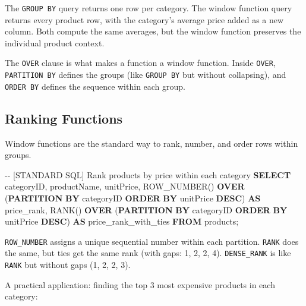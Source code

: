 \documentclass[
  letterpaper,
  DIV=11,
  numbers=noendperiod]{scrreprt}
\newenvironment{Shaded}{\begin{snugshade}}{\end{snugshade}}
\newcommand{\CommentTok}[1]{\textcolor[rgb]{0.37,0.37,0.37}{#1}}
\newcommand{\FunctionTok}[1]{\textcolor[rgb]{0.28,0.35,0.67}{#1}}
\newcommand{\KeywordTok}[1]{\textcolor[rgb]{0.00,0.23,0.31}{\textbf{#1}}}
\newcommand{\NormalTok}[1]{\textcolor[rgb]{0.00,0.23,0.31}{#1}}
\begin{document}
The \texttt{GROUP\ BY} query returns one row per category. The window
function query returns every product row, with the category's average
price added as a new column. Both compute the same averages, but the
window function preserves the individual product context.

The \texttt{OVER} clause is what makes a function a window function.
Inside \texttt{OVER}, \texttt{PARTITION\ BY} defines the groups (like
\texttt{GROUP\ BY} but without collapsing), and \texttt{ORDER\ BY}
defines the sequence within each group.

\subsection{Ranking Functions}\label{ranking-functions}

Window functions are the standard way to rank, number, and order rows
within groups.

\begin{codelisting}

\caption{\texttt{duckdb}}

\begin{Shaded}
\begin{Highlighting}[]
\CommentTok{{-}{-} [STANDARD SQL] Rank products by price within each category}
\KeywordTok{SELECT}
\NormalTok{    categoryID,}
\NormalTok{    productName,}
\NormalTok{    unitPrice,}
    \FunctionTok{ROW\_NUMBER}\NormalTok{() }\KeywordTok{OVER}\NormalTok{ (}\KeywordTok{PARTITION} \KeywordTok{BY}\NormalTok{ categoryID }\KeywordTok{ORDER} \KeywordTok{BY}\NormalTok{ unitPrice }\KeywordTok{DESC}\NormalTok{) }\KeywordTok{AS}\NormalTok{ price\_rank,}
    \FunctionTok{RANK}\NormalTok{() }\KeywordTok{OVER}\NormalTok{ (}\KeywordTok{PARTITION} \KeywordTok{BY}\NormalTok{ categoryID }\KeywordTok{ORDER} \KeywordTok{BY}\NormalTok{ unitPrice }\KeywordTok{DESC}\NormalTok{) }\KeywordTok{AS}\NormalTok{ price\_rank\_with\_ties}
\KeywordTok{FROM}\NormalTok{ products;}
\end{Highlighting}
\end{Shaded}

\end{codelisting}

\texttt{ROW\_NUMBER} assigns a unique sequential number within each
partition. \texttt{RANK} does the same, but ties get the same rank (with
gaps: 1, 2, 2, 4). \texttt{DENSE\_RANK} is like \texttt{RANK} but
without gaps (1, 2, 2, 3).

A practical application: finding the top 3 most expensive products in
each category:
\end{document}
